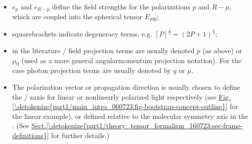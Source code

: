 \documentclass[letterpaper,table,10pt,english]{jupyterBook}
\begin{document}
\begin{itemize}
\item {} 
\sphinxAtStartPar
\(e_{p}\) and \(e_{R-p}\) define the field strengths for the polarizations \(p\) and \(R-p\), which are coupled into the spherical tensor \(E_{PR}\);

\item {} 
\sphinxAtStartPar
square\sphinxhyphen{}brackets indicate degeneracy terms, e.g. \([P]^{\frac{1}{2}} = (2P+1)^{\frac{1}{2}}\);

\item {} 
\sphinxAtStartPar
in the literature {\hyperref[\detokenize{backmatter/glossary:term-LF}]{}}/{\hyperref[\detokenize{backmatter/glossary:term-AF}]{}} field projection terms are usually denoted \(p\) (as above) or \(\mu_0\) (used as a more general angular\sphinxhyphen{}momentum projection notation). For the {\hyperref[\detokenize{backmatter/glossary:term-MF}]{}} case photon projection terms are usually denoted by \(q\) or \(\mu\).

\item {} 
\sphinxAtStartPar
The polarization vector or propagation direction is usually chosen to define the {\hyperref[\detokenize{backmatter/glossary:term-LF}]{}}/{\hyperref[\detokenize{backmatter/glossary:term-AF}]{}} z\sphinxhyphen{}axis for linear or non\sphinxhyphen{}linearly polarized light respectively (see \hyperref[\detokenize{part1/main_intro_060723:fig-bootstrap-concept-outline}]{Fig.\@ \ref{\detokenize{part1/main_intro_060723:fig-bootstrap-concept-outline}}} for the linear example), or defined relative to the molecular symmetry axis in the {\hyperref[\detokenize{backmatter/glossary:term-MF}]{}}. (See \hyperref[\detokenize{part1/theory_tensor_formalism_160723:sec-frame-definitions}]{Sect.\@ \ref{\detokenize{part1/theory_tensor_formalism_160723:sec-frame-definitions}}} for further details.)


\end{itemize}
\end{document}
